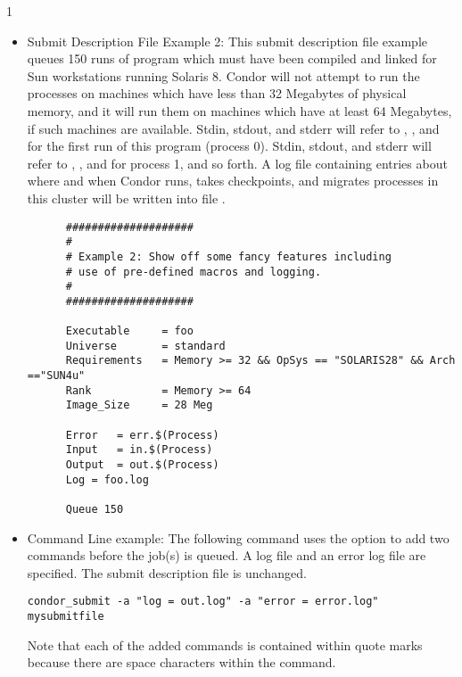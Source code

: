 \begin{ManPage}{\label{man-condor-submit}}{1}
\begin{itemize}
\item{Submit Description File Example 2:} This submit description file
example queues 150
runs of program  which must have been compiled and linked for
Sun workstations running Solaris 8.
Condor will not attempt
to run the processes on machines which have less than 32 Megabytes of
physical memory, and it will run them on machines which have at least 64
Megabytes, if such machines are available.
Stdin, stdout, and stderr will
refer to , , and  for the first run
of this program (process 0).
Stdin, stdout, and stderr will refer to
, , and  for process 1, and so forth.
A log file containing entries
about where and when Condor runs, takes checkpoints, and migrates processes
in this cluster will be written into file .

\footnotesize
\begin{verbatim}
      ####################                                                    
      #                                                                       
      # Example 2: Show off some fancy features including
      # use of pre-defined macros and logging.                                
      #                                                                       
      ####################                                                    
                                                                          
      Executable     = foo                                                    
      Universe       = standard
      Requirements   = Memory >= 32 && OpSys == "SOLARIS28" && Arch =="SUN4u"     
      Rank           = Memory >= 64
      Image_Size     = 28 Meg                                                 
                                                                          
      Error   = err.$(Process)                                                
      Input   = in.$(Process)                                                 
      Output  = out.$(Process)                                                
      Log = foo.log                                                                       
                                                                          
      Queue 150
\end{verbatim}
\normalsize

\item{Command Line example:} The following command uses the
 option to add two commands before the job(s) is queued.
A log file and an error log file are specified.
The submit description file is unchanged.
\footnotesize
\begin{verbatim}
condor_submit -a "log = out.log" -a "error = error.log" mysubmitfile
\end{verbatim}
\normalsize
Note that each of the added commands is contained within quote marks
because there are space characters within the command.


\end{itemize}
\end{ManPage}
